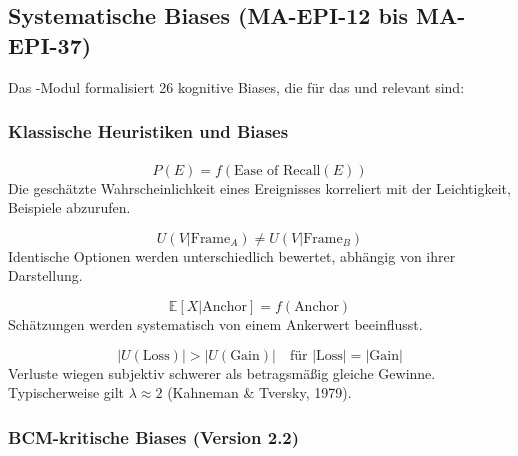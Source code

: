 \subsection{Systematische Biases (MA-EPI-12 bis MA-EPI-37)}

Das \META-Modul formalisiert 26 kognitive Biases, die für das \BCM{} und \BEATRIX{} relevant sind:

\subsubsection{Klassische Heuristiken und Biases}

\begin{axiom}
\begin{equation}
\hat{P}(E) = f(\text{Ease of Recall}(E))
\end{equation}
Die geschätzte Wahrscheinlichkeit eines Ereignisses korreliert mit der Leichtigkeit, Beispiele abzurufen.
\end{axiom}

\begin{axiom}
\begin{equation}
U(V|\text{Frame}_A) \neq U(V|\text{Frame}_B)
\end{equation}
Identische Optionen werden unterschiedlich bewertet, abhängig von ihrer Darstellung.
\end{axiom}

\begin{axiom}
\begin{equation}
\mathbb{E}[X|\text{Anchor}] = f(\text{Anchor})
\end{equation}
Schätzungen werden systematisch von einem Ankerwert beeinflusst.
\end{axiom}

\begin{axiom}
\begin{equation}
|U(\text{Loss})| > |U(\text{Gain})| \quad \text{für } |\text{Loss}| = |\text{Gain}|
\end{equation}
Verluste wiegen subjektiv schwerer als betragsmäßig gleiche Gewinne. Typischerweise gilt $\lambda \approx 2$ (Kahneman \& Tversky, 1979).
\end{axiom}

\subsubsection{BCM-kritische Biases (Version 2.2)}

